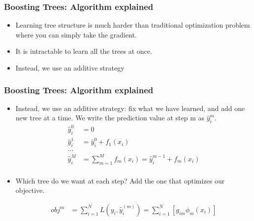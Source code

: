 \documentclass[
  shownotes,
  xcolor={svgnames},
  hyperref={colorlinks,citecolor=DarkBlue,linkcolor=DarkRed,urlcolor=DarkBlue}
  , aspectratio=169]{beamer}
\begin{document}
\begin{frame}[fragile]
\frametitle{Boosting Trees: Algorithm explained}

\begin{itemize}
\item Learning tree structure is much harder than traditional optimization problem where you can simply take the gradient. 
\medskip
\item It is intractable to learn all the trees at once.
\medskip
\item Instead, we use an additive strategy
\end{itemize}

 \end{frame}
\begin{frame}[fragile]
\frametitle{Boosting Trees: Algorithm explained}

\begin{itemize} 
\item Instead, we use an additive strategy: fix what we have learned, and add one new tree at a time. We write the prediction value at step m as $\hat{y}_i^{m}$. 
\begin{align}
\hat{y}_i^{0} &=0 \\ \nonumber
\hat{y}_i^{1} &= \hat{y}_i^{0} + f_1(x_i) \\ \nonumber
\dots \\ \nonumber
\hat{y}_i^{M} &= \sum_{m=1}^M f_m(x_i) = \hat{y}_i^{m-1} + f_m(x_i) \\ \nonumber
\end{align}

\item Which tree do we want at each step?  Add the one that optimizes our objective.

\begin{align}
obj^m &= \sum_{i=1}^N L(y_i,\hat{y}_i^{(m)}) = \sum_{i=1}^N \left[ g_{im} \phi_m(x_i) \right]
\end{align}
\end{itemize}


 \end{frame}
\end{document}
